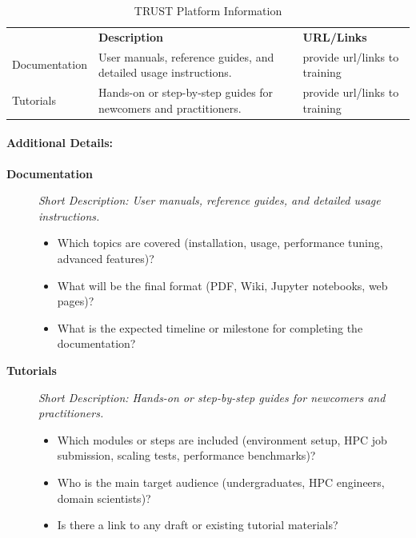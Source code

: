 \begin{table}[H]
{{%
    {
    \setlength{\parindent}{0pt}
    \def\arraystretch{1.25}
    {\fontsize{9}{11}\selectfont
    \begin{tabular}{!{\color{numpexgray}\vrule}p{0.20\textwidth}
                    !{\color{numpexgray}\vrule}p{0.40\textwidth}
                    !{\color{numpexgray}\vrule}p{0.35\textwidth}
                    !{\color{numpexgray}\vrule}}
         & {\rule{0pt}{2.5ex}\color{white}\bf Description} 
         & {\rule{0pt}{2.5ex}\color{white}\bf URL/Links} \\
Documentation & User manuals, reference guides, and detailed usage instructions. & provide url/links to training \\
Tutorials & Hands-on or step-by-step guides for newcomers and practitioners. & provide url/links to training \\
\bottomrule
    \end{tabular}
    }}

    }}
    \caption{TRUST Platform Information}
\end{table}


\paragraph{Additional Details:}
\begin{description}
\item[\textbf{Documentation}] %
\emph{Short Description: User manuals, reference guides, and detailed usage instructions.}

\begin{itemize}
  \item Which topics are covered (installation, usage, performance tuning, advanced features)?
  \item What will be the final format (PDF, Wiki, Jupyter notebooks, web pages)?
  \item What is the expected timeline or milestone for completing the documentation?
\end{itemize}

\item[\textbf{Tutorials}] %
\emph{Short Description: Hands-on or step-by-step guides for newcomers and practitioners.}

\begin{itemize}
  \item Which modules or steps are included (environment setup, HPC job submission, scaling tests, performance benchmarks)?
  \item Who is the main target audience (undergraduates, HPC engineers, domain scientists)?
  \item Is there a link to any draft or existing tutorial materials?
\end{itemize}

\end{description}


